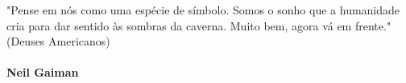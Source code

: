 {"Pense em nós como uma espécie de símbolo.
  Somos o sonho que a humanidade cria para dar sentido às sombras da
  caverna.
  Muito bem, agora vá em frente."
\\
  (Deuses Americanos)
\\
\\
\textbf{ Neil Gaiman } 
}




